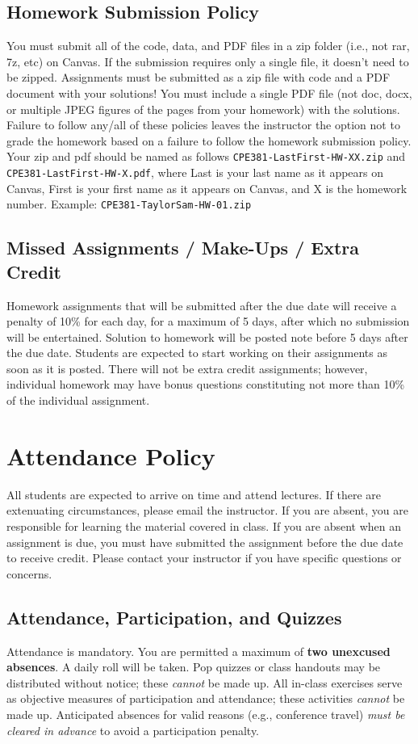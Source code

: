 \documentclass[11pt]{report}
\begin{document}
\section*{Homework Submission Policy}
You must submit all of the code, data, and PDF files in a zip folder (i.e., not rar, 7z, etc) on Canvas. If the submission requires only a single file, it doesn't need to be zipped. Assignments must be submitted as a zip file with code and a PDF document with your solutions! You must include a single PDF file (not doc, docx, or multiple JPEG figures of the pages from your homework) with the solutions. Failure to follow any/all of these policies leaves the instructor the option not to grade the homework based on a failure to follow the homework submission policy. Your zip and pdf should be named as follows \texttt{CPE381-LastFirst-HW-XX.zip} and \texttt{CPE381-LastFirst-HW-X.pdf}, where Last is your last name as it appears on Canvas, First is your first name as it appears on Canvas, and X is the homework number. Example: \texttt{CPE381-TaylorSam-HW-01.zip}

\section{Missed Assignments / Make-Ups / Extra Credit}
Homework assignments that will be submitted after the due date will receive a penalty of 10\% for each day, for a maximum of 5 days, after which no submission will be entertained. Solution to homework will be posted note before 5 days after the due date. Students are expected to start working on their assignments as soon as it is posted. There will not be extra credit assignments; however, individual homework may have bonus questions constituting not more than 10\% of the individual assignment.

\chapter{Attendance Policy}
All students are expected to arrive on time and attend lectures. If there are extenuating circumstances, please email the instructor. If you are absent, you are responsible for learning the material covered in class. If you are absent when an assignment is due, you must have submitted the assignment before the due date to receive credit. Please contact your instructor if you have specific questions or concerns.

\section*{Attendance, Participation, and Quizzes}
Attendance is mandatory. You are permitted a maximum of \textbf{two unexcused absences}. A daily roll will be taken. Pop quizzes or class handouts may be distributed without notice; these \emph{cannot} be made up. All in-class exercises serve as objective measures of participation and attendance; these activities \emph{cannot} be made up. Anticipated absences for valid reasons (e.g., conference travel) \emph{must be cleared in advance} to avoid a participation penalty.
\end{document}
